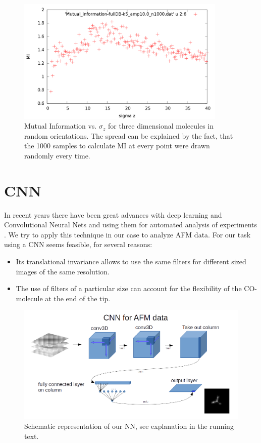 \documentclass{article}
\begin{document}
 \begin{figure}[htbp]
 	\begin{center}
 		\includegraphics[width=10cm]{figs/Mutual_information-fullDB-k5_amp10_n1000.png}
 		\caption{Mutual Information vs. $\sigma_z$ for three dimensional molecules in random orientations. The spread can be explained by the fact, that the 1000 samples to calculate MI at every point were drawn randomly every time.}
 		\label{fig:MIcurve}
 	\end{center}
 \end{figure}



\newpage
\section{CNN}
In recent years there have been great advances with deep learning and Convolutional Neural Nets \cite{krizhevsky2012imagenet} and using them for automated analysis of experiments \cite{kraus2017automated}. We try to apply this technique in our case to analyze AFM data. For our task using a CNN seems feasible, for several reasons:
\begin{itemize}
\item Its translational invariance allows to use the same filters for different sized images of the same resolution.
\item The use of filters of a particular size can account for the flexibility of the CO-molecule at the end of the tip.
\end{itemize}

 \begin{figure}[htbp]
 	\begin{center}
 		\includegraphics[width=12cm]{figs/minimal_CNN.png}
 		\caption{Schematic representation of our NN, see explanation in the running text.}
 		\label{fig:NNstruct}
 	\end{center}
 \end{figure}
\end{document}
